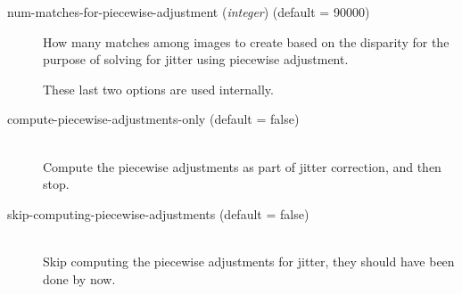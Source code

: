 \begin{description}
\item[num-matches-for-piecewise-adjustment \textnormal{\small{(\emph{integer})}} (default = 90000)]
How many matches among images to create based on the disparity for the purpose of solving for jitter using piecewise adjustment.

These last two options are used internally.

\item[compute-piecewise-adjustments-only \textnormal (default = false)] \hfill \\
Compute the piecewise adjustments as part of jitter correction, and then stop.

\item[skip-computing-piecewise-adjustments \textnormal (default = false)] \hfill \\
Skip computing the piecewise adjustments for jitter, they should have been done by now.

\end{description}
